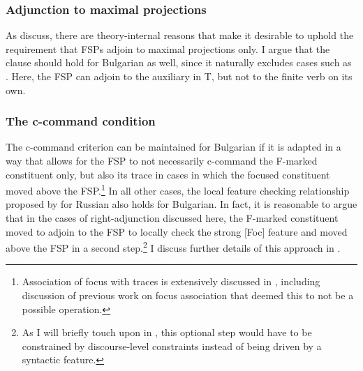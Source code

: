 \documentclass[output=paper,colorlinks,citecolor=brown]{langscibook}
\begin{document}
\subsubsection{Adjunction to maximal projections}\label{sec:3.3.2}
As \citet[240-244]{BuringHartmann2001} discuss, there are theory-internal reasons that make it desirable to uphold the requirement that FSPs adjoin to maximal projections only. I argue that the clause should hold for Bulgarian as well, since it naturally excludes cases such as . Here, the FSP can adjoin to the auxiliary in T, but not to the finite verb on its own. 

\ea\label{maximaldata}
\z
\z 

\subsubsection{The c-command condition}\label{sec:3.3.3}
The c-command criterion can be maintained for Bulgarian if it is adapted in a way that allows for the FSP to not necessarily c-command the F-marked constituent only, but also its trace in cases in which the focused constituent moved above the FSP.\footnote{Association of focus with traces is extensively discussed in \citet{Erlewine2014}, including discussion of previous work on focus association that deemed this to not be a possible operation.} In all other cases, the local feature checking relationship proposed by \citet{Zanon2018} for Russian also holds for Bulgarian. In fact, it is reasonable to argue that in the cases of right-adjunction discussed here, the F-marked constituent moved to adjoin to the FSP to locally check the strong [Foc] feature and moved above the FSP in a second step.\footnote{As I will briefly touch upon in , this optional step would have to be constrained by discourse-level constraints instead of being driven by a syntactic feature.} I discuss further details of this approach in . 
\end{document}
